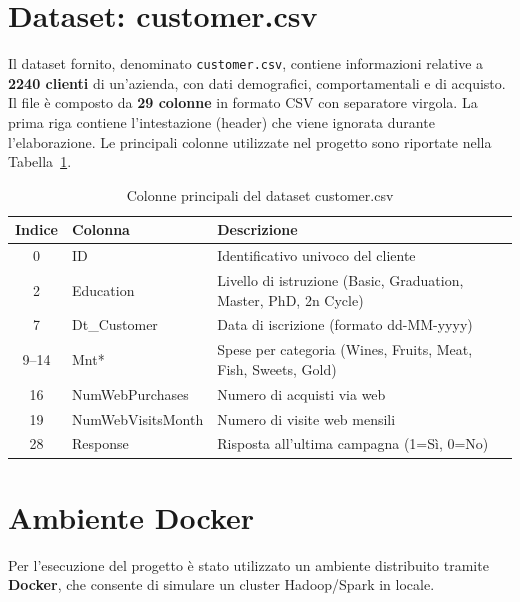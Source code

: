 \documentclass[a4paper, 12pt, oneside]{report}
\begin{document}
\section{Dataset: customer.csv}

Il dataset fornito, denominato \texttt{customer.csv}, contiene informazioni relative a \textbf{2240 clienti} di un'azienda, con dati demografici, comportamentali e di acquisto. Il file \`e composto da \textbf{29 colonne} in formato CSV con separatore virgola. La prima riga contiene l'intestazione (header) che viene ignorata durante l'elaborazione. Le principali colonne utilizzate nel progetto sono riportate nella Tabella~\ref{tab:dataset}.

\begin{table}[H]
    \centering
    \begin{tabular}{|c|l|p{7cm}|}
        \hline
        \textbf{Indice} & \textbf{Colonna} & \textbf{Descrizione} \\
        \hline
        0 & ID & Identificativo univoco del cliente \\
        \hline
        2 & Education & Livello di istruzione (Basic, Graduation, Master, PhD, 2n Cycle) \\
        \hline
        7 & Dt\_Customer & Data di iscrizione (formato dd-MM-yyyy) \\
        \hline
        9--14 & Mnt* & Spese per categoria (Wines, Fruits, Meat, Fish, Sweets, Gold) \\
        \hline
        16 & NumWebPurchases & Numero di acquisti via web \\
        \hline
        19 & NumWebVisitsMonth & Numero di visite web mensili \\
        \hline
        28 & Response & Risposta all'ultima campagna (1=S\`i, 0=No) \\
        \hline
    \end{tabular}
    \caption{Colonne principali del dataset customer.csv}
    \label{tab:dataset}
\end{table}

\section{Ambiente Docker}

Per l'esecuzione del progetto \`e stato utilizzato un ambiente distribuito tramite \textbf{Docker}, che consente di simulare un cluster Hadoop/Spark in locale.
\end{document}
